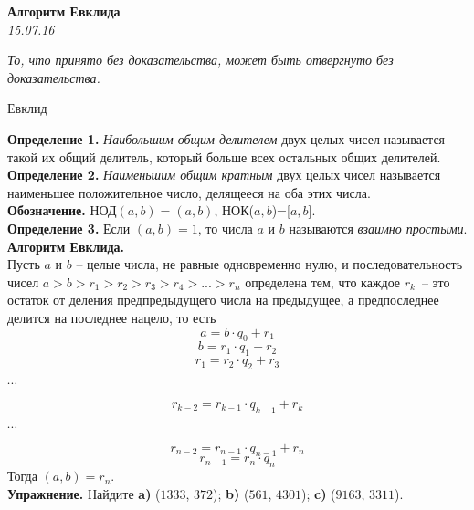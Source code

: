 \begin{center}
\textbf{\Large   Алгоритм Евклида }\\
\textit{15.07.16}
\end{center}

\epigraph{\it То, что принято без доказательства, может быть отвергнуто без доказательства.}{Евклид}

\indent \textbf{Определение 1.} \textit{Наибольшим общим делителем} двух целых чисел называется такой их общий делитель, который больше всех остальных общих делителей.\\
\indent \textbf{Определение 2.} \textit{Наименьшим общим кратным} двух целых чисел называется наименьшее положительное число, делящееся на оба этих числа.\\
\textbf{Обозначение.} НОД$(a,b)=(a,b)$, НОК($a,b$)=[$a,b$].\\
\textbf{Определение 3.} Если $(a,b)=1$, то числа $a$ и $b$ называются \textit{взаимно простыми}. 
\textbf{Алгоритм Евклида.}\\
Пусть $a$ и $b$ -- целые числа, не равные одновременно нулю, и последовательность чисел
$a > b > r_1 > r_2 > r_3 > r_4 > ... > r_n$
определена тем, что каждое $r_k$~-- это остаток от деления предпредыдущего числа на предыдущее, а предпоследнее делится на последнее нацело, то есть \\
\begin{equation*}
 a = b \cdot q_0 + r_1
\end{equation*}
\begin{equation*}
b = r_1  \cdot q_1 + r_2
\end{equation*}
\begin{equation*}
r_1 = r_2  \cdot q_2 + r_3
\end{equation*}
\begin{center} $\cdots$ \end{center}  
\begin{equation*}
r_{k-2} = r_{k-1}  \cdot q_{k-1} + r_k
\end{equation*}
\begin{center} $\cdots$ \end{center}
\begin{equation*}
r_{n-2} = r_{n-1}  \cdot q_{n-1}+ r_n
\end{equation*}
\begin{equation*}
r_{n-1} = r_n  \cdot q_n
\end{equation*}
Тогда $(a,b)=r_n$.\\
\textbf{Упражнение. } Найдите \textbf{a)} ($1333$, $372$);  \textbf{b)} ($561$, $4301$);   \textbf{c)} ($9163$, $3311$).



